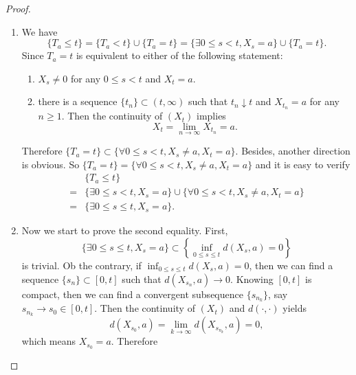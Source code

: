 \documentclass[12pt]{article}
\renewcommand{\(}{\left(}%
\renewcommand{\)}{\right)}%
\renewcommand{\[}{\left[}%
\renewcommand{\]}{\right]}%
\newtheorem{proof}{Proof.}}
\begin{document}
  \begin{proof}
  	\begin{enumerate}
  		\item We have
  	\begin{equation*}
  		\{T_a\leq t\}=\{T_a<t\}\cup\{T_a=t\}=\{\exists 0\leq s< t, X_s=a \}\cup\{T_a=t\}.
  	\end{equation*}
  	Since $T_a=t$ is equivalent to either of the following statement:
  	\begin{enumerate}
  		\item $X_s\neq 0$ for any $0\leq s<t$ and $X_t=a$.
  		\item there is a sequence $\{t_n\}\subset(t,\infty)$ such that $t_n\downarrow t$ and $X_{t_n}=a$ for any $n\geq 1$. Then the continuity of $(X_t)$ implies 
  	\begin{equation*}
  		X_t=\lim_{n\to\infty}X_{t_n}=a.
  	\end{equation*}
  	\end{enumerate}
  	 Therefore $\{T_a=t\}\subset \{\forall 0\leq s< t, X_s\neq a,X_t=a\}$. Besides, another direction is obvious. So $\{T_a=t\}=\{\forall 0\leq s< t, X_s\neq a,X_t=a\}$ and it is easy to verify
  	 \begin{equation*}
  	 	\begin{split}
  	 		&\{T_a\leq t\}\\
  	 		=&\{\exists 0\leq s< t, X_s=a \}\cup\{\forall 0\leq s< t, X_s\neq a,X_t=a\}\\
  	 		=&\{\exists 0\leq s\leq t, X_s=a \}.
  	 	\end{split}
  	 \end{equation*}
  		\item Now we start to prove the second equality. First, 
  	 \begin{equation*}
  	 	\{\exists 0\leq s\leq t, X_s=a \}\subset \left\{\inf_{0\leq s\leq t}d(X_s,a)=0\right\}
  	 \end{equation*}
  	 is trivial. Ob the contrary, if $\inf_{0\leq s\leq t}d(X_s,a)=0$, then we can find a sequence $\{s_n\}\subset[0,t]$ such that $d(X_{s_n},a)\to 0$. Knowing $[0,t]$ is compact, then we can find a convergent subsequence $\{s_{n_k}\}$, say $s_{n_k}\to s_0\in[0,t]$. Then the continuity of $(X_t)$ and $d(\cdot,\cdot )$ yields
  	 \begin{equation*}
  	 	d(X_{s_0},a)=\lim_{k\to\infty}d(X_{s_{n_k}},a)=0,
  	 \end{equation*} 
  	 which means $X_{s_0}=a$. Therefore 
  	 \begin{equation*}

\end{equation*}
\end{enumerate}
\end{proof}
\end{document}
